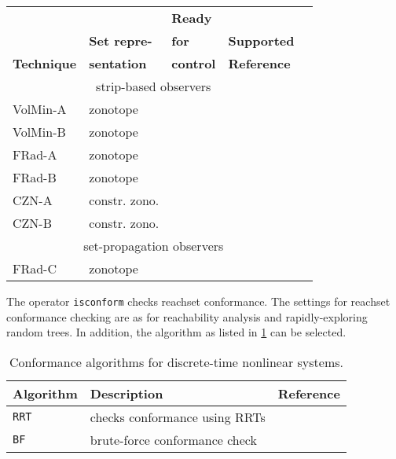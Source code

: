 \begin{table*}[tb]
	\caption{Algorithms for set-based estimation for discrete-time nonlinear systems.}
	\centering
	\label{tab:implementedObserversNonlinear}
	\begin{tabular}{llllc}
		\toprule
		& & {\bf Ready} \\
		& {\bf Set repre-} & {\bf for} & {\bf Supported} \\
		{\bf Technique} & {\bf sentation} & {\bf control} & {\bf Reference} \\
		\midrule
		\multicolumn{4}{c}{strip-based observers} \\
		\midrule
		VolMin-A &  zonotope &      \xmark & \cite{Alamo2005} \\
		VolMin-B &  zonotope &      \xmark & \cite{Bravo2006a} \\
		FRad-A &    zonotope &      \xmark & \cite{Alamo2005} \\
		FRad-B &    zonotope &      \xmark & \cite{Wang2018a} \\
		CZN-A &     constr. zono. & \xmark & \cite{Scott2016} \\
		CZN-B &     constr. zono. & \xmark & \cite{Alanwar2020b} \\
		\midrule
		\multicolumn{4}{c}{set-propagation observers} \\
		\midrule
		FRad-C &    zonotope &      \cmark & \cite{Combastel2015} \\
		\bottomrule
	\end{tabular}
\end{table*}





The operator \texttt{isconform} checks reachset conformance. 
The settings for reachset conformance checking are as for reachability analysis and rapidly-exploring random trees. In addition, the algorithm as listed in \cref{tab:nonlinAlgIsconform} can be selected.

\begin{table}[h]
	\caption{Conformance algorithms for discrete-time nonlinear systems.}
	\centering
	\label{tab:nonlinAlgIsconform}
	\begin{tabular}{lll}
		\toprule
		\textbf{Algorithm} & \textbf{Description} & \textbf{Reference} \\
		\midrule
		\texttt{RRT} & checks conformance using RRTs & \cite{Althoff2012b} \\
		\texttt{BF} & brute-force conformance check & \cite{Roehm2016} \\
		\bottomrule
	\end{tabular}
\end{table}
